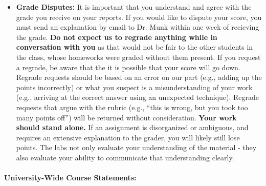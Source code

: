 \documentclass[11pt, a4paper]{article}
\begin{document}
\begin{itemize}
\item[] \textbf{Grade Disputes:} It is important that you understand and agree
        with the grade you receive on your reports. If you would like
        to dispute your score, you must send an explanation by email to Dr.
        Munk within one week of recieving the grade.
        \textbf{Do not expect us to regrade anything while in conversation with
        you} as that would not be fair to the other students in the class, whose
        homeworks were graded without them present.  If you request a regrade,
        be aware that the it is possible that your score will go down.
        Regrade requests should be based on an error on our part (e.g., adding
        up the points incorrectly) or what you suspect is a misunderstanding of
        your work (e.g., arriving at the correct answer using an unexpected
        technique). Regrade requests that argue with the rubric (e.g., ``this is
        wrong, but you took too many points off'') will be returned without
        consideration.
        \textbf{Your work should stand alone.} If an assignment is disorganized or
        ambiguous, and requires an extensive explanation to the grader, you
        will likely still lose points. The labs not only evaluate your
        understanding of the material - they also evaluate your ability to
        communicate that understanding clearly.
\end{itemize}

\paragraph{University-Wide Course Statements:}
\end{document}
